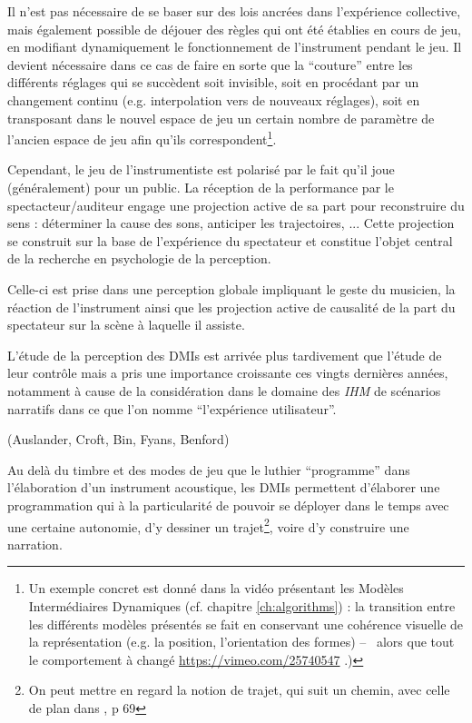 \noindent Il n'est pas nécessaire de se baser sur des lois ancrées dans l'expérience collective, mais également possible de déjouer des règles qui ont été établies en cours de jeu, en modifiant dynamiquement le fonctionnement de l'instrument pendant le jeu. Il devient nécessaire dans ce cas de faire en sorte que la ``couture'' entre les différents réglages qui se succèdent soit invisible, soit en procédant par un changement continu (e.g. interpolation vers de nouveaux réglages), soit en transposant dans le nouvel espace de jeu un certain nombre de paramètre de l'ancien espace de jeu afin qu'ils correspondent\footnote{Un exemple concret est donné dans la vidéo présentant les Modèles Intermédiaires Dynamiques (cf. chapitre \ref{ch:algorithms}) : la transition entre les différents modèles présentés se fait en conservant une cohérence visuelle de la représentation (e.g. la position, l'orientation des formes) --~ alors que tout le comportement à changé \url{https://vimeo.com/25740547} .)}.

\indent Cependant, le jeu de l'instrumentiste est polarisé par le fait qu'il joue (généralement) pour un public. La réception de la performance par le spectacteur/auditeur engage une projection active de sa part pour reconstruire du sens : déterminer la cause des sons, anticiper les trajectoires, ...  Cette projection se construit sur la base de l'expérience du spectateur et constitue l'objet central de la recherche en psychologie de la perception.


Celle-ci est prise dans une perception globale impliquant le geste du musicien, la réaction de l'instrument ainsi que les projection active de causalité de la part du spectateur sur la scène à laquelle il assiste.

L'étude de la perception des \glspl{DMI} est arrivée plus tardivement que l'étude de leur contrôle mais a pris une importance croissante ces vingts dernières années, notamment à cause de la considération dans le domaine des \textit{IHM} de scénarios narratifs dans ce que l'on nomme ``l'expérience utilisateur''. 

(Auslander, Croft, Bin, Fyans, Benford)


Au delà du timbre et des modes de jeu que le luthier ``programme'' dans l'élaboration d'un instrument acoustique, les \glspl{DMI} permettent d'élaborer une programmation qui à la particularité de pouvoir se déployer dans le temps avec une certaine autonomie, d'y dessiner un trajet\footnote{On peut mettre en regard la notion de trajet, qui suit un chemin, avec celle de plan    dans \cite{leroi-gourhan_geste_1964}, p 69}, voire d'y construire une narration. 

